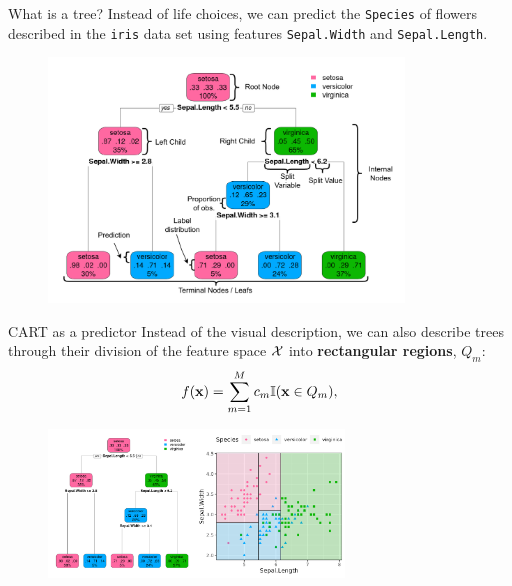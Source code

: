 \documentclass[11pt,compress,t,notes=noshow, xcolor=table]{beamer}
\begin{document}
\begin{vbframe}{What is a tree?}
Instead of life choices, we can predict the \texttt{Species} of flowers described in the \texttt{iris} data set using features \texttt{Sepal.Width} and \texttt{Sepal.Length}.
  
    \begin{figure}
    \centering
      \includegraphics[height = 6.5cm, keepaspectratio]{figure/cart_intro_annotated-tree.pdf}
    \end{figure}
\end{vbframe}

\begin{vbframe}{CART as a predictor}
Instead of the visual description, we can also describe trees through their division of the feature space $\mathcal{X}$ into \textbf{rectangular regions}, $Q_m$: 
  \begin{align*}
    f(\mathbf{x}) = \sum_{m=1}^M c_m \mathbb{I}(\mathbf{x} \in Q_m),
  \end{align*}
  \begin{figure}
    \centering
\includegraphics[width=0.7\textwidth, keepaspectratio]{figure/tree-classif-depth-3-blacklines.pdf}
    \end{figure}
\end{vbframe}
\end{document}
